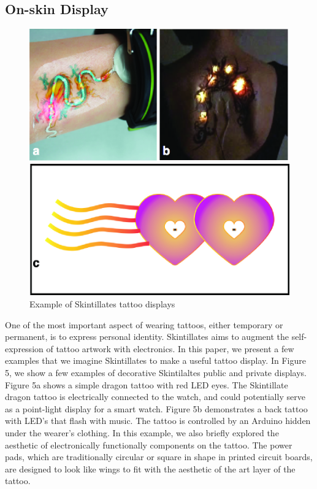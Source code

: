 \documentclass{sigchi}
\begin{document}
\subsection{On-skin Display}
\begin{figure}[!h]
\centering
\includegraphics[width=1\columnwidth]{figures/Figure5}
\caption{Example of Skintillates tattoo displays}
\label{fig:figure5}
\end{figure}
One of the most important aspect of wearing tattoos, either temporary or permanent, is to express personal identity. Skintillates aims to augment the self-expression of tattoo artwork with electronics. In this paper, we present a few examples that we imagine Skintillates to make a useful tattoo display. In Figure 5, we show a few examples of decorative Skintilaltes public and private displays. Figure 5a shows a simple dragon tattoo with red LED eyes. The Skintillate dragon tattoo is electrically connected to the watch, and could potentially serve as a point-light display for a smart watch. Figure 5b demonstrates a back tattoo with LED’s that flash with music. The tattoo is controlled by an Arduino hidden under the wearer’s clothing. In this example, we also briefly explored the aesthetic of electronically functionally components on the tattoo. The power pads, which are traditionally circular or square in shape in printed circuit boards, are designed to look like wings to fit with the aesthetic of the art layer of the tattoo. 
\end{document}
